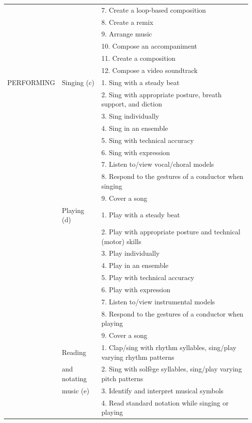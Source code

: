 \documentclass[journal]{IEEEtran}
\begin{document}
\begin{table}[htbp]
\begin{tabular}{p{}p{}p{}}
		& & 7. Create a loop-based composition\\
		& & 8. Create a remix\\
		& & 9. Arrange music\\
		& & 10. Compose an accompaniment\\
		& & 11. Create a composition\\
		& & 12. Compose a video soundtrack\\
		\hline\noalign{\smallskip}
		PERFORMING & Singing (c)& 1. Sing with a steady beat\\
		& & 2. Sing with appropriate posture, breath support, and diction\\
		& & 3. Sing individually\\
		& & 4. Sing in an ensemble\\
		& & 5. Sing with technical accuracy\\
		& & 6. Sing with expression\\
		& & 7. Listen to/view vocal/choral models\\
		& & 8. Respond to the gestures of a conductor when singing\\
		& & 9. Cover a song\\
		
		\cline{2-3}
		
		& Playing (d)& 1. Play with a steady beat\\
		& & 2. Play with appropriate posture and technical (motor) skills\\
		& & 3. Play individually\\
		& & 4. Play in an ensemble\\
		& & 5. Play with technical accuracy\\
		& & 6. Play with expression\\
		
		& & 7. Listen to/view instrumental models\\
		& & 8. Respond to the gestures of a conductor when playing\\
		& & 9. Cover a song\\
		
		\cline{2-3}
		
		&  Reading & 1. Clap/sing with rhythm syllables, sing/play varying rhythm patterns\\
		& and notating & 2. Sing with solf\`{e}ge syllables, sing/play varying pitch patterns\\
		& music (e) & 3. Identify and interpret musical symbols\\
		&  & 4. Read standard notation while singing or playing\\
		

\end{tabular}
\end{table}
\end{document}
